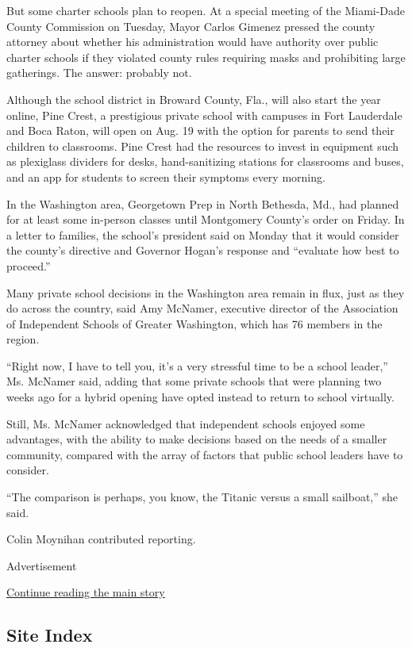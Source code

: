 But some charter schools plan to reopen. At a special meeting of the
Miami-Dade County Commission on Tuesday, Mayor Carlos Gimenez pressed
the county attorney about whether his administration would have
authority over public charter schools if they violated county rules
requiring masks and prohibiting large gatherings. The answer: probably
not.

Although the school district in Broward County, Fla., will also start
the year online, Pine Crest, a prestigious private school with campuses
in Fort Lauderdale and Boca Raton, will open on Aug. 19 with the option
for parents to send their children to classrooms. Pine Crest had the
resources to invest in equipment such as plexiglass dividers for desks,
hand-sanitizing stations for classrooms and buses, and an app for
students to screen their symptoms every morning.

In the Washington area, Georgetown Prep in North Bethesda, Md., had
planned for at least some in-person classes until Montgomery County's
order on Friday. In a letter to families, the school's president said on
Monday that it would consider the county's directive and Governor
Hogan's response and ``evaluate how best to proceed.''

Many private school decisions in the Washington area remain in flux,
just as they do across the country, said Amy McNamer, executive director
of the Association of Independent Schools of Greater Washington, which
has 76 members in the region.

``Right now, I have to tell you, it's a very stressful time to be a
school leader,'' Ms. McNamer said, adding that some private schools that
were planning two weeks ago for a hybrid opening have opted instead to
return to school virtually.

Still, Ms. McNamer acknowledged that independent schools enjoyed some
advantages, with the ability to make decisions based on the needs of a
smaller community, compared with the array of factors that public school
leaders have to consider.

``The comparison is perhaps, you know, the Titanic versus a small
sailboat,'' she said.

Colin Moynihan contributed reporting.

Advertisement

\protect\hyperlink{after-bottom}{Continue reading the main story}

\hypertarget{site-index}{%
\subsection{Site Index}\label{site-index}}

